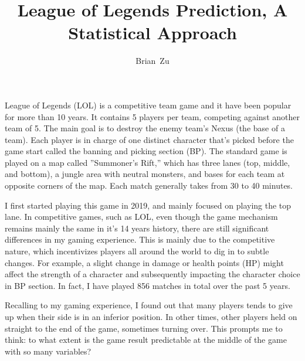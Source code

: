 \documentclass[stu,12pt,floatsintext]{apa7}
\title{League of Legends Prediction, A Statistical Approach} %
\author{Brian~Zu}
\affiliation{}
\begin{document}
\maketitle

League of Legends (LOL) is a competitive team game and it have been popular for more than 10 years. It contains 5 players per team, competing against another team of 5. The main goal is to destroy the enemy team's Nexus (the base of a team). Each player is in charge of one distinct character that's picked before the game start called the banning and picking section (BP).  The standard game is played on a map called ”Summoner's Rift,” which has three lanes (top, middle, and bottom), a jungle area with neutral monsters, and bases for each team at opposite corners of the map. Each match generally takes from 30 to 40 minutes. 

I first started playing this game in 2019, and mainly focused on playing the top lane. In competitive games, such as LOL, even though the game mechanism remains mainly the same in it's 14 years history, there are still significant differences in my gaming experience. This is mainly due to the competitive nature, which incentivizes players all around the world to dig in to subtle changes. For example, a slight change in damage or health points (HP) might affect the strength of a character and subsequently impacting the character choice in BP section. In fact, I have played 856 matches in total over the past 5 years.

Recalling to my gaming experience, I found out that many players tends to give up when their side is in an inferior position. In other times, other players held on straight to the end of the game, sometimes turning over. This prompts me to think: to what extent is the game result predictable at the middle of the game with so many variables?
\end{document}
